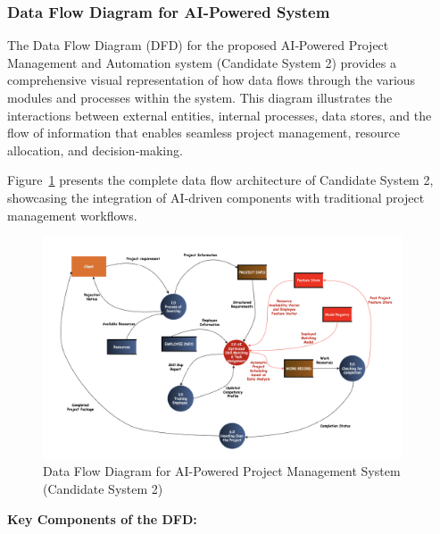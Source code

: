 \documentclass[12pt,a4paper]{article}
\begin{document}
\subsubsection{Data Flow Diagram for AI-Powered System}
The Data Flow Diagram (DFD) for the proposed AI‑Powered Project Management and Automation system (Candidate System 2) provides a comprehensive visual representation of how data flows through the various modules and processes within the system.  This diagram illustrates the interactions between external entities, internal processes, data stores, and the flow of information that enables seamless project management, resource allocation, and decision‑making.

Figure~\ref{fig:dfd_system_design} presents the complete data flow architecture of Candidate System 2, showcasing the integration of AI‑driven components with traditional project management workflows.

\begin{figure}[H]
\centering
\includegraphics[width=0.95\textwidth]{Fig/dfd_candidate_system2.png}
\caption{Data Flow Diagram for AI-Powered Project Management System (Candidate System 2)}
\label{fig:dfd_system_design}
\end{figure}

\textbf{Key Components of the DFD:}
\end{document}
